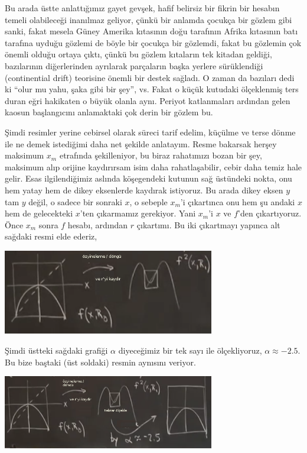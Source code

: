 \documentclass[12pt,fleqn]{article}\usepackage{../../common}
\begin{document}
Bu arada üstte anlattığımız gayet gevşek, hafif belirsiz bir fikrin bir hesabın
temeli olabileceği inanılmaz geliyor, çünkü bir anlamda çocukça bir gözlem gibi
sanki, fakat mesela Güney Amerika kıtasının doğu tarafının Afrika kıtasının batı
tarafına uyduğu gözlemi de böyle bir çocukça bir gözlemdi, fakat bu gözlemin çok
önemli olduğu ortaya çıktı, çünkü bu gözlem kıtaların tek kitadan geldiği,
bazılarının diğerlerinden ayrılarak parçaların başka yerlere sürüklendiği
(continential drift) teorisine önemli bir destek sağladı. O zaman da bazıları
dedi ki ``olur mu yahu, şaka gibi bir şey'', vs. Fakat o küçük kutudaki
ölçeklenmiş ters duran eğri hakikaten o büyük olanla aynı. Periyot katlanmaları
ardından gelen kaosun başlangıcını anlamaktaki çok derin bir gözlem bu.

Şimdi resimler yerine cebirsel olarak süreci tarif edelim, küçülme ve terse
dönme ile ne demek istediğimi daha net şekilde anlatayım. Resme bakarsak herşey
maksimum $x_m$ etrafında şekilleniyor, bu biraz rahatımızı bozan bir şey,
maksimum alıp orijine kaydırırsam isim daha rahatlaşabilir, cebir daha temiz
hale gelir. Esas ilgilendiğimiz aslında köşegendeki kutunun sağ üstündeki nokta,
onu hem yatay hem de dikey eksenlerde kaydırak istiyoruz. Bu arada dikey eksen
$y$ tam $y$ değil, o sadece bir sonraki $x$, o sebeple $x_m$'i çıkartınca onu
hem şu andaki $x$ hem de gelecekteki $x$'ten çıkarmamız gerekiyor. Yani $x_m$'i
$x$ ve $f$'den çıkartıyoruz. Önce $x_m$ sonra $f$ hesabı, ardından $r$
çıkartımı. Bu iki çıkartmayı yapınca alt sağdaki resmi elde ederiz,

\includegraphics[width=25em]{21_07.png}

Şimdi üstteki sağdaki grafiği $\alpha$ diyeceğimiz bir tek sayı ile
ölçekliyoruz, $\alpha \approx -2.5$. Bu bize baştaki (üst soldaki) resmin
aynısını veriyor.

\includegraphics[width=25em]{21_08.png}
\end{document}
